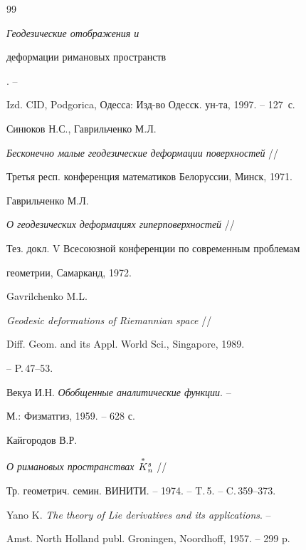\begin{thebibliography}{99}
{\it Геодезические отображения и


деформации римановых пространств}. -- 


Izd. CID, Podgorica, Одесса: Изд-во Одесск. ун-та, 1997. -- 127~с.







Синюков Н.С., Гаврильченко М.Л.


{\it Бесконечно малые геодезические деформации поверхностей} //


Третья респ. конференция математиков Белоруссии, Минск, 1971.







Гаврильченко М.Л.


{\it О геодезических деформациях гиперповерхностей} //


Тез. докл. V Всесоюзной конференции по современным проблемам


геометрии, Самарканд, 1972.







Gavrilchenko M.L.


{\it Geodesic deformations of Riemannian space}  //


Diff. Geom. and its Appl. World Sci., Singapore, 1989.


-- P.\,47--53. 







Векуа И.Н. {\it Обобщенные аналитические функции}. --


М.: Физматгиз, 1959. -- 628 с.







Кайгородов В.Р.


{\it О римановых пространствах $\overset{\ast}{K}{}^s_n$} //


Тр. геометрич. семин. ВИНИТИ. -- 1974. -- T.\,5. -- C.\,359--373.







Yano K. {\it The theory of Lie derivatives and its applications}. -- 


Amst. North Holland publ. Groningen, Noordhoff, 1957. -- 299 p.






\end{thebibliography}
